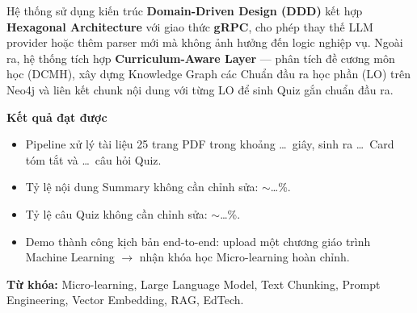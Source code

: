 Hệ thống sử dụng kiến trúc \textbf{Domain-Driven Design (DDD)} kết hợp
\textbf{Hexagonal Architecture} với giao thức \textbf{gRPC}, cho phép thay thế
LLM provider hoặc thêm parser mới mà không ảnh hưởng đến logic nghiệp vụ.
Ngoài ra, hệ thống tích hợp \textbf{Curriculum-Aware Layer} --- phân tích đề
cương môn học (DCMH), xây dựng Knowledge Graph các Chuẩn đầu ra học phần (LO)
trên Neo4j và liên kết chunk nội dung với từng LO để sinh Quiz gắn chuẩn đầu ra.

\vspace{0.5cm}

\noindent\textbf{\large Kết quả đạt được}

\vspace{0.3cm}

\begin{itemize}
    \item Pipeline xử lý tài liệu 25 trang PDF trong khoảng \ldots\ giây,
          sinh ra \ldots\ Card tóm tắt và \ldots\ câu hỏi Quiz.
    \item Tỷ lệ nội dung Summary không cần chỉnh sửa: $\sim$\ldots\%.
    \item Tỷ lệ câu Quiz không cần chỉnh sửa: $\sim$\ldots\%.
    \item Demo thành công kịch bản end-to-end: upload một chương giáo trình
          Machine Learning $\to$ nhận khóa học Micro-learning hoàn chỉnh.
\end{itemize}

\vspace{0.5cm}

\noindent\textbf{\large Từ khóa:} Micro-learning, Large Language Model, Text
Chunking, Prompt Engineering, Vector Embedding, RAG, EdTech.
